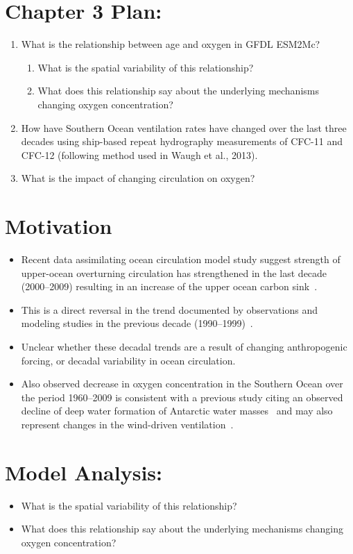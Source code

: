 \documentclass[article,12pt]{article}
\begin{document}
\section{Chapter 3 Plan:}
\begin{enumerate}
  \item What is the relationship between age and oxygen in GFDL ESM2Mc?
  \begin{enumerate}
      \item What is the spatial variability of this relationship?
      \item What does this relationship say about the underlying mechanisms changing
      oxygen concentration?
  \end{enumerate}
  \item How have Southern Ocean ventilation rates have changed over the last three
  decades using ship-based repeat hydrography measurements of CFC-11 and CFC-12
  (following method used in Waugh et al., 2013).
  \item What is the impact of changing circulation on oxygen?
\end{enumerate}

\section{Motivation}
\begin{itemize}
  \item Recent data assimilating ocean circulation model study suggest strength of upper-ocean overturning circulation has
  strengthened in the last decade (2000--2009) resulting in an increase of the upper
  ocean carbon sink~\cite{Devries2017}.
  \item This is a direct reversal in the trend documented by observations and modeling
  studies in the previous decade (1990--1999)~\cite{Lovenduski2007,Waugh2013b,LeQuere2007e}.
  \item Unclear whether these decadal trends are a result of changing anthropogenic
  forcing, or decadal variability in ocean circulation.
  \item Also observed decrease in oxygen concentration in the Southern Ocean over
  the period 1960--2009 is consistent with a previous study citing an observed decline
  of deep water formation of Antarctic water masses~\cite{Purkey2012} and may also represent
  changes in the wind-driven ventilation~\cite{Schmidtko2017}.
\end{itemize}

\section{Model Analysis:}
\begin{itemize}
    \item What is the spatial variability of this relationship?
    \item What does this relationship say about the underlying mechanisms changing
    oxygen concentration?
\end{itemize}
\end{document}

